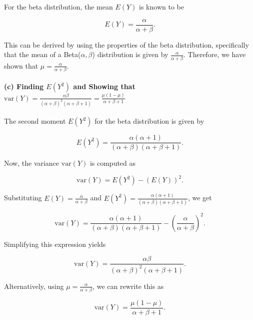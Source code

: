 \documentclass[
]{article}
\begin{document}
For the beta distribution, the mean \(E(Y)\) is known to be

\[
E(Y) = \frac{\alpha}{\alpha + \beta}.
\]

This can be derived by using the properties of the beta distribution,
specifically that the mean of a Beta(\(\alpha, \beta\)) distribution is
given by \(\frac{\alpha}{\alpha + \beta}\). Therefore, we have shown
that \(\mu = \frac{\alpha}{\alpha + \beta}\).

\hypertarget{c-finding-ey2-and-showing-that-textvary-fracalpha-betaalpha-beta2alpha-beta-1-fracmu-1---mualpha-beta-1}{%
\paragraph{\texorpdfstring{(c) Finding \(E(Y^2)\) and Showing that
\(\text{var}(Y) = \frac{\alpha \beta}{(\alpha + \beta)^2(\alpha + \beta + 1)} = \frac{\mu (1 - \mu)}{\alpha + \beta + 1}\)}{(c) Finding E(Y\^{}2) and Showing that \textbackslash text\{var\}(Y) = \textbackslash frac\{\textbackslash alpha \textbackslash beta\}\{(\textbackslash alpha + \textbackslash beta)\^{}2(\textbackslash alpha + \textbackslash beta + 1)\} = \textbackslash frac\{\textbackslash mu (1 - \textbackslash mu)\}\{\textbackslash alpha + \textbackslash beta + 1\}}}\label{c-finding-ey2-and-showing-that-textvary-fracalpha-betaalpha-beta2alpha-beta-1-fracmu-1---mualpha-beta-1}}

The second moment \(E(Y^2)\) for the beta distribution is given by

\[
E(Y^2) = \frac{\alpha (\alpha + 1)}{(\alpha + \beta)(\alpha + \beta + 1)}.
\]

Now, the variance \(\text{var}(Y)\) is computed as

\[
\text{var}(Y) = E(Y^2) - (E(Y))^2.
\]

Substituting \(E(Y) = \frac{\alpha}{\alpha + \beta}\) and
\(E(Y^2) = \frac{\alpha (\alpha + 1)}{(\alpha + \beta)(\alpha + \beta + 1)}\),
we get

\[
\text{var}(Y) = \frac{\alpha (\alpha + 1)}{(\alpha + \beta)(\alpha + \beta + 1)} - \left( \frac{\alpha}{\alpha + \beta} \right)^2.
\]

Simplifying this expression yields

\[
\text{var}(Y) = \frac{\alpha \beta}{(\alpha + \beta)^2(\alpha + \beta + 1)}.
\]

Alternatively, using \(\mu = \frac{\alpha}{\alpha + \beta}\), we can
rewrite this as

\[
\text{var}(Y) = \frac{\mu (1 - \mu)}{\alpha + \beta + 1}.
\]
\end{document}
